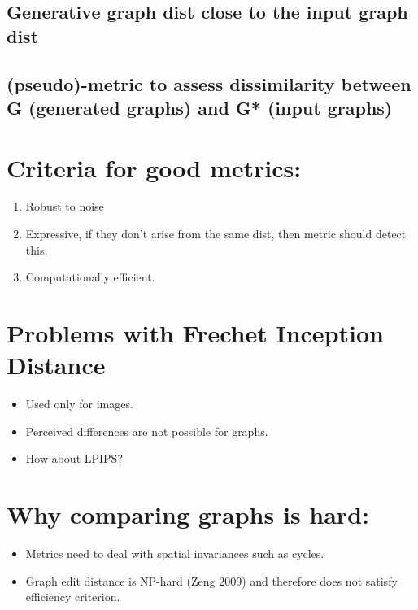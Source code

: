 \documentclass[12pt]{article}
\begin{document}
\subsection{Generative graph dist close to the input graph dist}
\label{sec:orge5030dd}
\subsection{(pseudo)-metric to assess dissimilarity between G (generated graphs) and G* (input graphs)}
\label{sec:org646e1e7}

\section{Criteria for good metrics:}
\label{sec:org5e3d246}
\begin{enumerate}
\item Robust to noise
\item Expressive, if they don't arise from the same dist, then metric should detect this.
\item Computationally efficient.
\end{enumerate}

\section{Problems with Frechet Inception Distance}
\label{sec:org5f06944}
\begin{itemize}
\item Used only for images.
\item Perceived differences are not possible for graphs.
\item How about LPIPS?
\end{itemize}

\section{Why comparing graphs is hard:}
\label{sec:orgd5aecb8}
\begin{itemize}
\item Metrics need to deal with spatial invariances such as cycles.
\item Graph edit distance is NP-hard (Zeng 2009) and therefore does not satisfy efficiency criterion.
\end{itemize}
\end{document}
